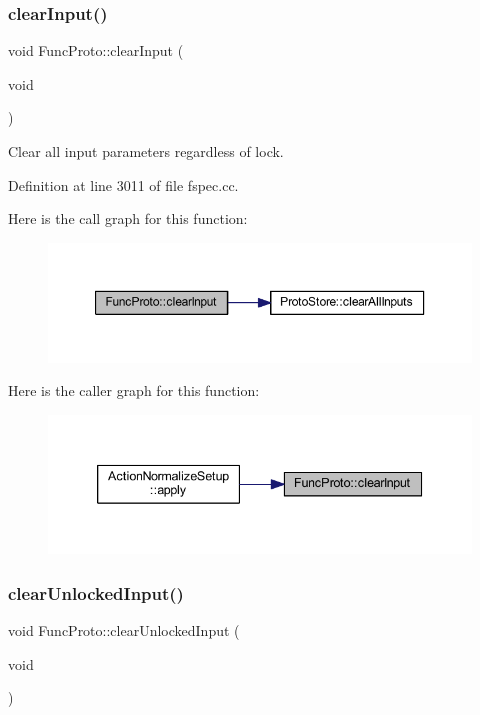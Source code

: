 \subsubsection{\texorpdfstring{clearInput()}{clearInput()}}
{\footnotesize\ttfamily void Func\+Proto\+::clear\+Input (\begin{DoxyParamCaption}\item[{void}]{ }\end{DoxyParamCaption})}



Clear all input parameters regardless of lock. 



Definition at line 3011 of file fspec.\+cc.

Here is the call graph for this function\+:
\nopagebreak
\begin{figure}[H]
\begin{center}
\leavevmode
\includegraphics[width=350pt]{class_func_proto_af8059930e66577c8906ade2f36f65cce_cgraph}
\end{center}
\end{figure}
Here is the caller graph for this function\+:
\nopagebreak
\begin{figure}[H]
\begin{center}
\leavevmode
\includegraphics[width=339pt]{class_func_proto_af8059930e66577c8906ade2f36f65cce_icgraph}
\end{center}
\end{figure}
\mbox{\label{class_func_proto_ae91eb49088323b42bdb38b83586eea6f}} 
\subsubsection{\texorpdfstring{clearUnlockedInput()}{clearUnlockedInput()}}
{\footnotesize\ttfamily void Func\+Proto\+::clear\+Unlocked\+Input (\begin{DoxyParamCaption}\item[{void}]{ }\end{DoxyParamCaption})}



